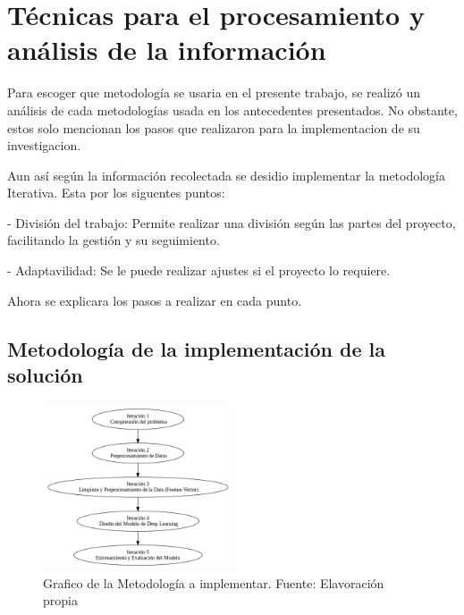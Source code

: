 \section{Técnicas para el procesamiento y análisis de la información}
Para escoger que metodología se usaria en el presente trabajo, se realizó un análisis de cada metodologías usada en los antecedentes presentados. No obstante, estos solo mencionan los pasos que realizaron para la implementacion de su investigacion.

 Aun así según la información recolectada se desidio implementar la metodología Iterativa. Esta por los siguentes puntos:
 
 - División del trabajo: Permite realizar una división según las partes del proyecto, facilitando la gestión y su seguimiento.
 
 - Adaptavilidad: Se le puede realizar ajustes si el proyecto lo requiere.
 
 Ahora se explicara los pasos a realizar en cada punto.
 


\subsection{Metodología de la implementación de la solución}



\begin{figure}[h]
	\begin{center}
		\includegraphics[width=0.5\textwidth]{3/figures/metodologia.png}
		\caption{Grafico de la Metodología a implementar. Fuente: Elavoración propia}
		\label{1:fig 19}
	\end{center}
\end{figure}


